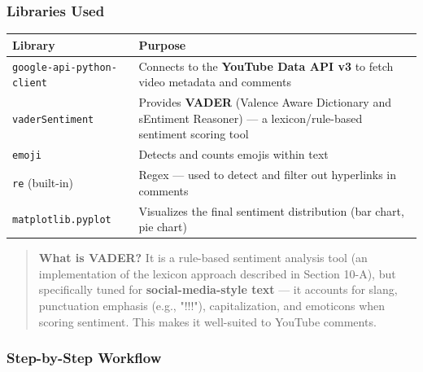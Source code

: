 \documentclass[12pt,openany]{book}
\begin{document}
\subsubsection{Libraries Used}

\begin{center}
\begin{tabular}{|L{0.30\textwidth}|L{0.60\textwidth}|}
\hline
Library & Purpose \\
\hline
\texttt{google-api-}\allowbreak\texttt{python-client} & Connects to the \textbf{YouTube Data API v3} to fetch video metadata and comments \\
\hline
\texttt{vaderSentiment} & Provides \textbf{VADER} (Valence Aware Dictionary and sEntiment Reasoner) --- a lexicon/rule-based sentiment scoring tool \\
\hline
\texttt{emoji} & Detects and counts emojis within text \\
\hline
\texttt{re} (built-in) & Regex --- used to detect and filter out hyperlinks in comments \\
\hline
\texttt{matplotlib.pyplot} & Visualizes the final sentiment distribution (bar chart, pie chart) \\
\hline
\end{tabular}
\end{center}

\begin{quote}
\textbf{What is VADER?} It is a rule-based sentiment analysis tool (an implementation of the lexicon approach described in Section 10-A), but specifically tuned for \textbf{social-media-style text} --- it accounts for slang, punctuation emphasis (e.g., "!!!"), capitalization, and emoticons when scoring sentiment. This makes it well-suited to YouTube comments.\par

\end{quote}

\subsubsection{Step-by-Step Workflow}
\end{document}
